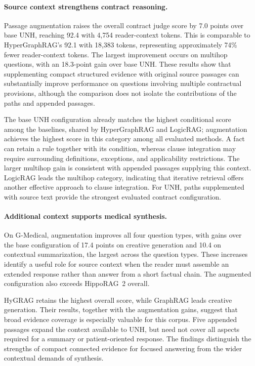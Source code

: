 \documentclass[sigconf, review, anonymous]{acmart}
\newcommand{\sys}{UNH}
\begin{document}
\paragraph{Source context strengthens contract reasoning.}
Passage augmentation raises the overall contract judge score by 7.0 points over base UNH, reaching 92.4 with 4,754 reader-context tokens. This is comparable to HyperGraphRAG's 92.1 with 18,383 tokens, representing approximately 74\% fewer reader-context tokens. The largest improvement occurs on multihop questions, with an 18.3-point gain over base UNH. These results show that supplementing compact structured evidence with original source passages can substantially improve performance on questions involving multiple contractual provisions, although the comparison does not isolate the contributions of the paths and appended passages.

The base \sys{} configuration already matches the highest conditional score among the baselines, shared by HyperGraphRAG and LogicRAG; augmentation achieves the highest score in this category among all evaluated methods. A fact can retain a rule together with its condition, whereas clause integration may require surrounding definitions, exceptions, and applicability restrictions. The larger multihop gain is consistent with appended passages supplying this context. LogicRAG leads the multihop category, indicating that iterative retrieval offers another effective approach to clause integration. For \sys{}, paths supplemented with source text provide the strongest evaluated contract configuration.

\paragraph{Additional context supports medical synthesis.}
On G-Medical, augmentation improves all four question types, with gains over the base configuration of 17.4 points on creative generation and 10.4 on contextual summarization, the largest across the question types. These increases identify a useful role for source context when the reader must assemble an extended response rather than answer from a short factual chain. The augmented configuration also exceeds HippoRAG~2 overall.

HyGRAG retains the highest overall score, while GraphRAG leads creative generation. Their results, together with the augmentation gains, suggest that broad evidence coverage is especially valuable for this corpus. Five appended passages expand the context available to \sys{}, but need not cover all aspects required for a summary or patient-oriented response. The findings distinguish the strengths of compact connected evidence for focused answering from the wider contextual demands of synthesis.
\end{document}
